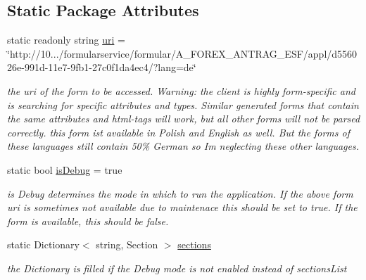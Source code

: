 \subsection*{Static Package Attributes}
\begin{DoxyCompactItemize}
\item 
static readonly string \hyperlink{class_listen_to_me_1_1_app_a2c50cfed33094aff84b281be8244f41a}{uri} = \char`\"{}http\+://10.../formularservice/formular/A\+\_\+\+F\+O\+R\+E\+X\+\_\+\+A\+N\+T\+R\+A\+G\+\_\+\+E\+SF/appl/d556026e-\/991d-\/11e7-\/9fb1-\/27c0f1da4ec4/?lang=de\char`\"{}
\begin{DoxyCompactList}\small\item\em the uri of the form to be accessed. Warning\+: the client is highly form-\/specific and is searching for specific attributes and types. Similar generated forms that contain the same attributes and html-\/tags will work, but all other forms will not be parsed correctly. this form ist available in Polish and English as well. But the forms of these languages still contain 50\% German so I\textquotesingle{}m neglecting these other languages. \end{DoxyCompactList}\item 
static bool \hyperlink{class_listen_to_me_1_1_app_a59acc333f6141d00101170b53ad29754}{is\+Debug} = true
\begin{DoxyCompactList}\small\item\em is Debug determines the mode in which to run the application. If the above form uri is sometimes not available due to maintenace this should be set to true. If the form is available, this should be false. \end{DoxyCompactList}\item 
static Dictionary$<$ string, Section $>$ \hyperlink{class_listen_to_me_1_1_app_a0ceb5219b35307c9377448b1071ee4cc}{sections}
\begin{DoxyCompactList}\small\item\em the Dictionary is filled if the Debug mode is not enabled instead of sections\+List \end{DoxyCompactList}\end{DoxyCompactItemize}
